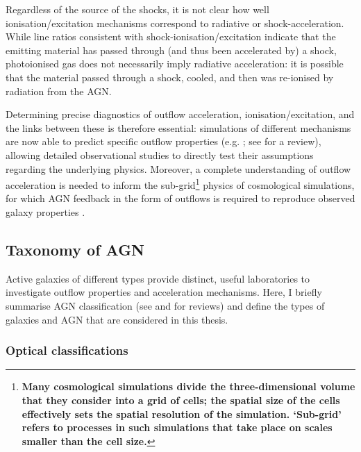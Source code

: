 Regardless of the source of the shocks, it is not clear how well ionisation/excitation mechanisms correspond to radiative or shock-acceleration. While line ratios consistent with shock-ionisation/excitation indicate that the emitting material has passed through (and thus been accelerated by) a shock, photoionised gas does not necessarily imply radiative acceleration: it is possible that the material passed through a shock, cooled, and then was re-ionised by radiation from the AGN. 

Determining precise diagnostics of outflow acceleration, ionisation/excitation, and the links between these is therefore essential: simulations of different mechanisms are now able to predict specific outflow properties (e.g. \citealt{Richings2021, Meenakshi2022a, Meenakshi2022b}; see \citealt{Krause2023} for a review), allowing detailed observational studies to directly test their assumptions regarding the underlying physics. Moreover, a complete understanding of outflow acceleration is needed to inform the sub-grid\footnote{\textbf{Many cosmological simulations divide the three-dimensional volume that they consider into a grid of cells; the spatial size of the cells effectively sets the spatial resolution of the simulation. `Sub-grid' refers to processes in such simulations that take place on scales smaller than the cell size.}} physics of cosmological simulations, for which AGN feedback in the form of outflows is required to reproduce observed galaxy properties \citep{Schaye2015, Dubois2016, Dave2019, Zinger2020}.

\subsection{Taxonomy of AGN}
\label{section: introduction: outflows: taxonomy_of_agn}

Active galaxies of different types provide distinct, useful laboratories to investigate outflow properties and acceleration mechanisms. Here, I briefly summarise AGN classification (see \citealt{Netzer2015} and \citealt{Tadhunter2008, Tadhunter2016} for reviews) and define the types of galaxies and AGN that are considered in this thesis. 

\subsubsection{Optical classifications}
\label{section: introduction: outflows: taxonomy_of_agn: seyferts_and_quasars}

